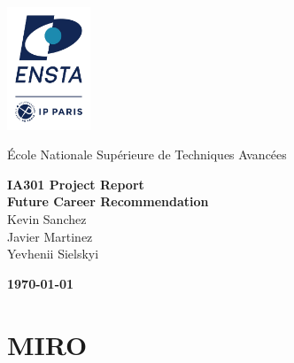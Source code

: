 \documentclass[english]{article}
\begin{document}
\begin{titlepage}
    \vfill
    \begin{minipage}{0.1\textwidth}
    	\includegraphics[width=2.5cm]{./figures/ENSTA.jpeg}
    \end{minipage}
    \hspace*{0.9cm}
    \begin{minipage}{1\textwidth}
    
    	
    	{\large École Nationale Supérieure de Techniques Avancées}
    \end{minipage}
    
    \begin{center}
		\vspace*{6cm}
		
		{\large \textbf{IA301 Project Report}}
		\\
		{\large\bfseries Future Career Recommendation} \\[4cm]

		{Kevin Sanchez \\ Javier Martinez \\ Yevhenii Sielskyi}
		
		\vspace*{2.5cm}
		{\large \bfseries \today}
		\vfill
	\end{center}
\end{titlepage}

\section{MIRO}
\end{document}
